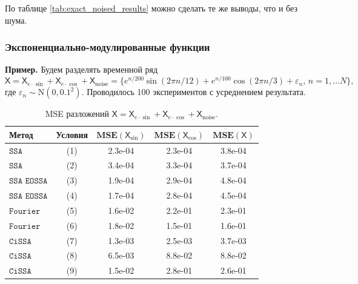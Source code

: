 \documentclass[12pt, specialist, subf
]{disser}
\theoremstyle{definition}
\newcommand{\SSA}{\texttt{SSA}}
\newcommand{\EOSSA}{\texttt{SSA EOSSA}}
\newcommand{\CISSA}{\texttt{CiSSA}}
\newcommand{\FOURIER}{\texttt{Fourier}}
\newcommand{\TS}{\mathsf{X}}
\newcommand{\MSE}{\textbf{MSE}}
\begin{document}
По таблице \ref{tab:exact_noised_results} можно сделать те же выводы, что и без шума.

\subsubsection{Экспоненциально-модулированные функции}


\textbf{\large{Пример.}} Будем разделять временной ряд 
\[
\TS = \TS_{e \cdot \sin} + \TS_{e \cdot \cos} + \TS_{\mathrm{noise}} = \{e^{n/200}\sin(2\pi n/12) + e^{n/100}\cos(2\pi n/3)+ \varepsilon_n, \, n = 1, \dots N \},
 \] где $\varepsilon_n \sim \mathrm N(0, 0.1^2)$. Проводилось 100 экспериментов с усреднением результата.

\begin{table}[H]
\centering
\caption{MSE разложений \(\TS = \TS_{e \cdot \sin} + \TS_{e \cdot \cos}+\TS_{\mathrm{noise}}\).}
\label{tab:exp_mod_noised_results}
\begin{tabular}{l|c|ccc}
  \hline
  \textbf{Метод} & \textbf{Условия} & \(\MSE(\TS_{\sin})\) & \(\MSE(\TS_{\cos})\) & \(\MSE(\TS)\) \\ 
  \hline
  $\SSA$    & (1) & 2.3e-04 & 2.3e-04 & 3.8e-04 \\ 
  $\SSA$    & (2) &3.4e-04 & 3.3e-04 & 3.7e-04 \\ 
  \hline
  $\EOSSA$  & (3) & 1.9e-04 & 2.9e-04 & 4.8e-04 \\ 
  $\EOSSA$  & (4) & 1.7e-04 & 2.8e-04 & 4.5e-04 \\ 
  \hline
  $\FOURIER$    & (5) & 1.6e-02 & 2.2e-01 & 2.3e-01 \\ 
  $\FOURIER$ & (6) & 1.8e-02 & 1.5e-01 & 1.6e-01 \\ 
  \hline
  $\CISSA$  & (7) & 1.3e-03 & 2.5e-03 & 3.7e-03 \\ 
  $\CISSA$ & (8) & 6.5e-03 & 8.8e-02 & 8.8e-02 \\ 
  $\CISSA$ & (9) &  1.5e-02 & 2.8e-01 & 2.6e-01 \\ 
  \hline
\end{tabular}
\end{table}
\end{document}

